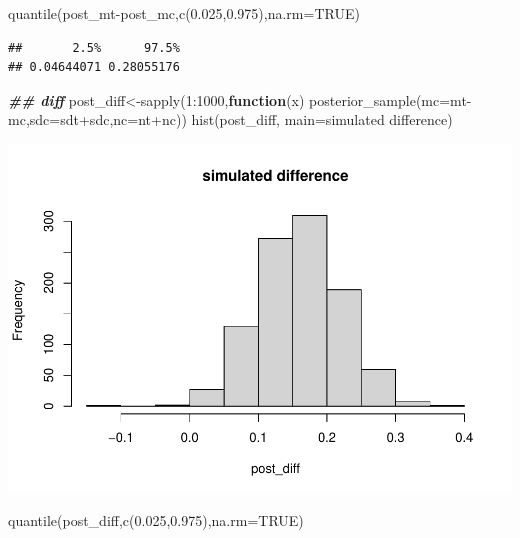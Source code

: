 \documentclass[
]{book}
\newenvironment{Shaded}{\begin{snugshade}}{\end{snugshade}}
\newcommand{\AttributeTok}[1]{\textcolor[rgb]{0.77,0.63,0.00}{#1}}
\newcommand{\ConstantTok}[1]{\textcolor[rgb]{0.00,0.00,0.00}{#1}}
\newcommand{\ControlFlowTok}[1]{\textcolor[rgb]{0.13,0.29,0.53}{\textbf{#1}}}
\newcommand{\DecValTok}[1]{\textcolor[rgb]{0.00,0.00,0.81}{#1}}
\newcommand{\DocumentationTok}[1]{\textcolor[rgb]{0.56,0.35,0.01}{\textbf{\textit{#1}}}}
\newcommand{\FloatTok}[1]{\textcolor[rgb]{0.00,0.00,0.81}{#1}}
\newcommand{\FunctionTok}[1]{\textcolor[rgb]{0.00,0.00,0.00}{#1}}
\newcommand{\NormalTok}[1]{#1}
\newcommand{\OtherTok}[1]{\textcolor[rgb]{0.56,0.35,0.01}{#1}}
\newcommand{\SpecialCharTok}[1]{\textcolor[rgb]{0.00,0.00,0.00}{#1}}
\newcommand{\StringTok}[1]{\textcolor[rgb]{0.31,0.60,0.02}{#1}}
\theoremstyle{definition}
\theoremstyle{definition}
\theoremstyle{definition}
\theoremstyle{definition}
\theoremstyle{remark}
\begin{document}
\begin{Shaded}
\begin{Highlighting}[]
         \FunctionTok{quantile}\NormalTok{(post\_mt}\SpecialCharTok{{-}}\NormalTok{post\_mc,}\FunctionTok{c}\NormalTok{(}\FloatTok{0.025}\NormalTok{,}\FloatTok{0.975}\NormalTok{),}\AttributeTok{na.rm=}\ConstantTok{TRUE}\NormalTok{)}
\end{Highlighting}
\end{Shaded}

\begin{verbatim}
##       2.5%      97.5% 
## 0.04644071 0.28055176
\end{verbatim}

\begin{Shaded}
\begin{Highlighting}[]
  \DocumentationTok{\#\# diff}
\NormalTok{         post\_diff}\OtherTok{\textless{}{-}}\FunctionTok{sapply}\NormalTok{(}\DecValTok{1}\SpecialCharTok{:}\DecValTok{1000}\NormalTok{,}\ControlFlowTok{function}\NormalTok{(x) }\FunctionTok{posterior\_sample}\NormalTok{(}\AttributeTok{mc=}\NormalTok{mt}\SpecialCharTok{{-}}\NormalTok{mc,}\AttributeTok{sdc=}\NormalTok{sdt}\SpecialCharTok{+}\NormalTok{sdc,}\AttributeTok{nc=}\NormalTok{nt}\SpecialCharTok{+}\NormalTok{nc))}
    \FunctionTok{hist}\NormalTok{(post\_diff, }\AttributeTok{main=}\StringTok{\textquotesingle{}simulated difference\textquotesingle{}}\NormalTok{)}
\end{Highlighting}
\end{Shaded}

\includegraphics{_main_files/figure-latex/unnamed-chunk-32-2.pdf}

\begin{Shaded}
\begin{Highlighting}[]
             \FunctionTok{quantile}\NormalTok{(post\_diff,}\FunctionTok{c}\NormalTok{(}\FloatTok{0.025}\NormalTok{,}\FloatTok{0.975}\NormalTok{),}\AttributeTok{na.rm=}\ConstantTok{TRUE}\NormalTok{)}
\end{Highlighting}
\end{Shaded}
\end{document}
